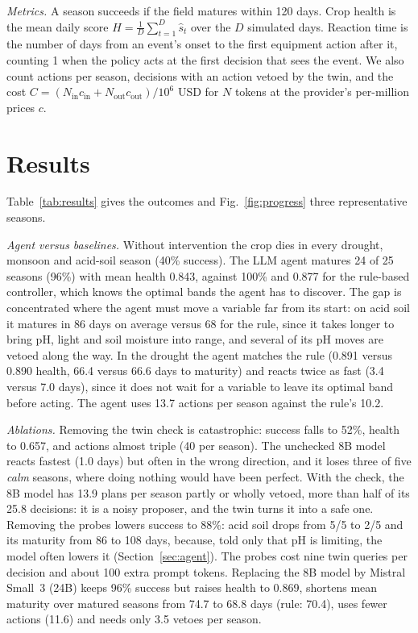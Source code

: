 \documentclass[conference]{IEEEtran}
\begin{document}
\textit{Metrics.} A season succeeds if the field matures within 120 days. Crop health is the
mean daily score $H=\frac{1}{D}\sum_{t=1}^{D}\hat s_t$ over the $D$ simulated days. Reaction time
is the number of days from an event's onset to the first equipment action after it, counting 1
when the policy acts at the first decision that sees the event. We also count actions per
season, decisions with an action vetoed by the twin, and the cost $C=(N_{\text{in}}c_{\text{in}}+N_{\text{out}}c_{\text{out}})/10^6$ USD for
$N$ tokens at the provider's per-million prices $c$.

\section{Results}\label{sec:results}

Table~\ref{tab:results} gives the outcomes and Fig.~\ref{fig:progress} three representative
seasons.

\textit{Agent versus baselines.} Without intervention the crop dies in every drought, monsoon
and acid-soil season (40\% success). The LLM agent matures 24 of 25 seasons (96\%) with mean
health 0.843, against 100\% and 0.877 for the rule-based controller, which knows the optimal
bands the agent has to discover. The gap is concentrated where the agent must move a variable
far from its start: on acid soil it matures in 86 days on average versus 68 for the rule,
since it takes longer to bring pH, light and soil moisture into range, and several of its pH
moves are vetoed along the way. In the drought the agent matches the rule (0.891 versus 0.890
health, 66.4 versus 66.6 days to maturity) and reacts twice as fast (3.4 versus 7.0 days), since
it does not wait for a variable to leave its optimal band before acting. The agent uses 13.7 actions per season against the rule's 10.2.

\textit{Ablations.} Removing the twin check is catastrophic: success falls to 52\%, health to
0.657, and actions almost triple (40 per season). The unchecked 8B model reacts fastest
(1.0 days) but often in the wrong direction, and it loses three of five \emph{calm}
seasons, where doing nothing would have been perfect. With the check, the 8B model has 13.9 plans
per season partly or wholly vetoed, more than half of its 25.8 decisions: it is a noisy
proposer, and the twin turns it into a safe one. Removing the probes lowers success to 88\%:
acid soil drops from 5/5 to 2/5 and its maturity from 86 to 108 days, because, told only that pH
is limiting, the model often lowers it (Section~\ref{sec:agent}). The probes cost nine twin
queries per decision and about 100 extra prompt tokens. Replacing the 8B model by Mistral Small~3
(24B) keeps 96\% success but raises health to 0.869, shortens mean maturity over matured
seasons from 74.7 to 68.8 days (rule: 70.4), uses fewer actions (11.6) and needs only 3.5 vetoes per season.
\end{document}

